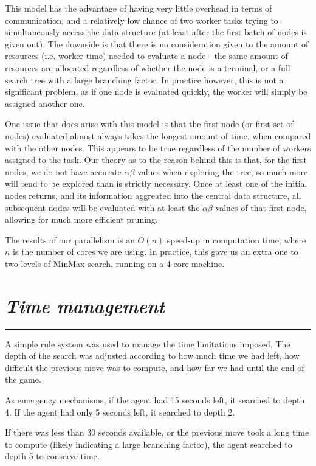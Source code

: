 \documentclass[10pt]{report}
\begin{document}
\begin{multicols}{2}
This model has the advantage of having very little overhead in terms of communication, and a relatively low chance of two worker tasks trying to simultaneously access the data structure (at least after the first batch of nodes is given out). The downside is that there is no consideration given to the amount of resources (i.e. worker time) needed to evaluate a node - the same amount of resources are allocated regardless of whether the node is a terminal, or a full search tree with a large branching factor. In practice however, this is not a significant problem, as if one node is evaluated quickly, the worker will simply be assigned another one.

One issue that does arise with this model is that the first node (or first set of nodes) evaluated almost always takes the longest amount of time, when compared with the other nodes. This appears to be true regardless of the number of workers assigned to the task. Our theory as to the reason behind this is that, for the first nodes, we do not have accurate $\alpha\beta$ values when exploring the tree, so much more will tend to be explored than is strictly necessary. Once at least one of the initial nodes returns, and its information aggreated into the central data structure, all subsequent nodes will be evaluated with at least the $\alpha\beta$ values of that first node, allowing for much more efficient pruning.

The results of our parallelism is an $O(n)$ speed-up in computation time, where $n$ is the number of cores we are using. In practice, this gave us an extra one to two levels of MinMax search, running on a 4-core machine.
\section*{\emph{Time management}}
\hrule

A simple rule system was used to manage the time limitations imposed. The depth of the search was adjusted according to how much time we had left, how difficult the previous move was to compute, and how far we had until the end of the game.

As emergency mechanisms, if the agent had 15 seconds left, it searched to depth 4. If the agent had only 5 seconds left, it searched to depth 2.

If there was less than 30 seconds available, or the previous move took a long time to compute (likely indicating a large branching factor), the agent searched to depth 5 to conserve time.


\end{multicols}
\end{document}
